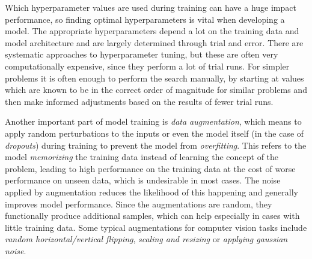 Which hyperparameter values are used during training can have a huge impact performance, so finding optimal hyperparameters is vital when developing a model. 
The appropriate hyperparameters depend a lot on the training data and model architecture and are largely determined through trial and error. 
There are systematic approaches to hyperparameter tuning, but these are often very computationally expensive, since they perform a lot of trial runs. 
For simpler problems it is often enough to perform the search manually, by starting at values which are known to be in the correct order of magnitude for similar problems and then make informed adjustments based on the results of fewer trial runs. 

Another important part of model training is \emph{data augmentation}, which means to apply random perturbations to the inputs or even the model itself (in the case of \emph{dropouts}) during training to prevent the model from \emph{overfitting}. 
This refers to the model \emph{memorizing} the training data instead of learning the concept of the problem, leading to high performance on the training data at the cost of worse performance on unseen data, which is undesirable in most cases. 
The noise applied by augmentation reduces the likelihood of this happening and generally improves model performance. 
Since the augmentations are random, they functionally produce additional samples, which can help especially in cases with little training data. 
Some typical augmentations for computer vision tasks include \emph{random horizontal/vertical flipping}, \emph{scaling and resizing} or \emph{applying gaussian noise}. 